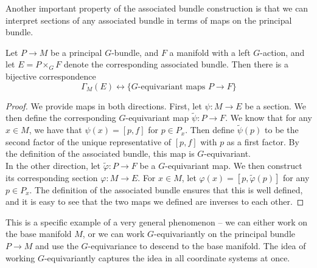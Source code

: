 \documentclass[abstract=on,twoside]{scrreprt}
\begin{document}
Another important property of the associated bundle construction is that we can
interpret sections of any associated bundle in terms of maps on the principal bundle.
%
\begin{proposition}
Let $P \to M$ be a principal $G$-bundle, and $F$ a manifold with a left $G$-action, and
let $E = P \times_G F$ denote the corresponding associated bundle. Then there
is a bijective correspondence
\[
\Gamma_M(E) \longleftrightarrow \{G\text{-equivariant maps } P \to F\}
\]
\end{proposition}
%
\begin{proof}
We provide maps in both directions. First, let $\psi : M \to E$ be a section. We
then define the corresponding $G$-equivariant map $\widetilde{\psi} : P \to F$.
We know that for any $x \in M$, we have that $\psi(x) = [p, f]$ for $p \in P_x$.
Then define $\widetilde{\psi}(p)$ to be the second factor of the unique representative
of $[p,f]$ with $p$ as a first factor. By the definition of the associated bundle,
this map is $G$-equivariant. \\

In the other direction, let $\widetilde{\varphi} : P \to F$ be a $G$-equivariant map.
We then construct its corresponding section $\varphi : M \to E$. For $x \in M$,
let $\varphi(x) = [p,\tilde{\varphi}(p)]$ for any $p \in P_x$. The definition of
the associated bundle ensures that this is well defined, and it is easy to see that
the two maps we defined are inverses to each other.
\end{proof}
This is a specific example of a very general phenomenon -- we can either work on the
base manifold $M$, or we can work $G$-equivariantly on the principal bundle $P \to M$
and use the $G$-equivariance to descend to the base manifold. The idea of working
$G$-equivariantly captures the idea in all coordinate systems at once. \\
%
\end{document}
